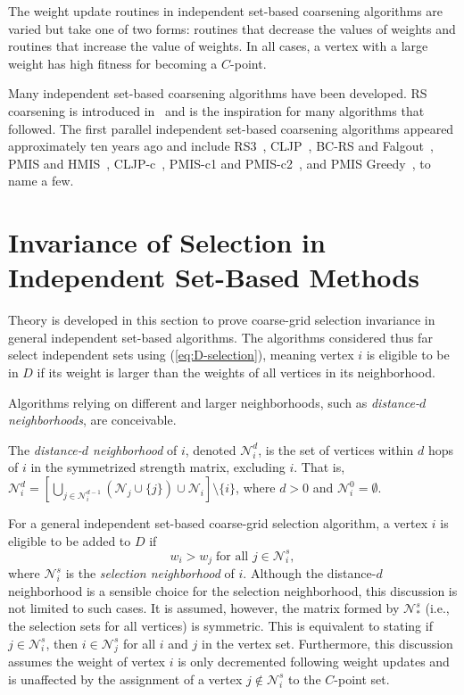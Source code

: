 \documentclass{elsart}
\begin{document}
The weight update routines in independent set-based coarsening
algorithms are varied but take one of two forms: routines that
decrease the values of weights and routines that increase the value of
weights. In all cases, a vertex with a large weight has high fitness
for becoming a $C$-point.

Many independent set-based coarsening algorithms have been
developed. RS coarsening is introduced in~\cite{Ruge1987} and is the
inspiration for many algorithms that followed. The first parallel
independent set-based coarsening algorithms appeared approximately ten
years ago and include RS3~\cite{Henson2002}, CLJP~\cite{Cleary1998},
BC-RS and Falgout~\cite{Henson2002}, PMIS and HMIS~\cite{Sterck2006},
CLJP-c~\cite{alber-cljpc}, PMIS-c1 and PMIS-c2~\cite{alber-PCGS}, and
PMIS Greedy~\cite{Butler2006}, to name a few.

\section{Invariance of Selection in Independent Set-Based Methods}
\label{sec:invariance}

Theory is developed in this section to prove coarse-grid selection
invariance in general independent set-based algorithms. The algorithms
considered thus far select independent sets using
(\ref{eq:D-selection}), meaning vertex $i$ is eligible to be in $D$ if
its weight is larger than the weights of all vertices in its
neighborhood.

Algorithms relying on different and larger neighborhoods, such as
\emph{distance-$d$ neighborhoods}, are conceivable.
\begin{defn}
The \emph{distance-$d$ neighborhood} of $i$, denoted
$\mathcal{N}_i^d$, is the set of vertices within $d$ hops of $i$ in
the symmetrized strength matrix, excluding $i$. That is,
$\mathcal{N}_i^d = \left[\bigcup_{j \in
\mathcal{N}_i^{d-1}}\left(\mathcal{N}_j \cup \{j\}\right)\cup
\mathcal{N}_i\right] \setminus \{i\}$, where $d > 0$ and
$\mathcal{N}_i^0 = \emptyset$.
\end{defn}

For a general independent set-based coarse-grid selection algorithm, a
vertex $i$ is eligible to be added to $D$ if
\begin{equation}
\label{eqn:general-selection}
w_i > w_j\;\textrm{for all } j \in \mathcal{N}_i^s,
\end{equation}
where $\mathcal{N}_i^s$ is the \emph{selection neighborhood} of
$i$. Although the distance-$d$ neighborhood is a sensible choice for
the selection neighborhood, this discussion is not limited to such
cases. It is assumed, however, the matrix formed by $\mathcal{N}_*^s$
(i.e., the selection sets for all vertices) is symmetric. This is
equivalent to stating if $j \in \mathcal{N}_i^s$, then $i \in
\mathcal{N}_j^s$ for all $i$ and $j$ in the vertex set. Furthermore,
this discussion assumes the weight of vertex $i$ is only decremented
following weight updates and is unaffected by the assignment of a
vertex $j \notin \mathcal{N}_i^s$ to the $C$-point set.
\end{document}
